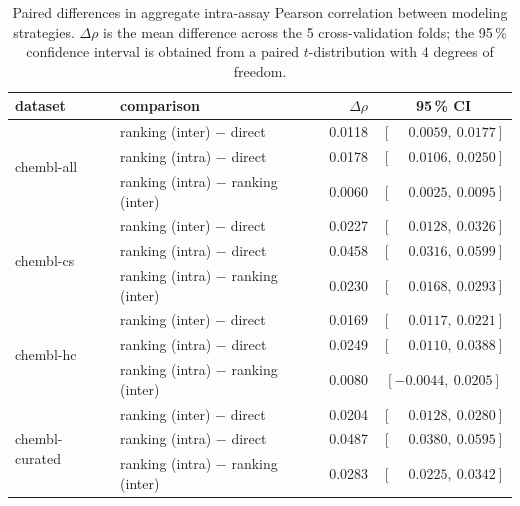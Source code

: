\begin{table}[tb]
\centering
\caption{\label{tab:pairwise-differences-chembl}Paired differences in aggregate intra-assay Pearson
correlation between modeling strategies. $\Delta\rho$ is the mean difference across the 5
cross-validation folds; the 95\,\% confidence interval is obtained from a paired $t$-distribution
with $4$ degrees of freedom.}
\begin{tabular}{llrc}
\toprule
{dataset} & {comparison} & {$\Delta\rho$} & {95\,\% CI} \\
\midrule
\multirow[t]{3}{*}{chembl-all}
 & ranking (inter) $-$ direct & 0.0118 & $[\phantom{-}0.0059,\ 0.0177]$ \\
 & ranking (intra) $-$ direct & 0.0178 & $[\phantom{-}0.0106,\ 0.0250]$ \\
 & ranking (intra) $-$ ranking (inter) & 0.0060 & $[\phantom{-}0.0025,\ 0.0095]$ \\
\midrule
\multirow[t]{3}{*}{chembl-cs}
 & ranking (inter) $-$ direct & 0.0227 & $[\phantom{-}0.0128,\ 0.0326]$ \\
 & ranking (intra) $-$ direct & 0.0458 & $[\phantom{-}0.0316,\ 0.0599]$ \\
 & ranking (intra) $-$ ranking (inter) & 0.0230 & $[\phantom{-}0.0168,\ 0.0293]$ \\
\midrule
\multirow[t]{3}{*}{chembl-hc}
 & ranking (inter) $-$ direct & 0.0169 & $[\phantom{-}0.0117,\ 0.0221]$ \\
 & ranking (intra) $-$ direct & 0.0249 & $[\phantom{-}0.0110,\ 0.0388]$ \\
 & ranking (intra) $-$ ranking (inter) & 0.0080 & $[-0.0044,\ 0.0205]$ \\
\midrule
\multirow[t]{3}{*}{chembl-curated}
 & ranking (inter) $-$ direct & 0.0204 & $[\phantom{-}0.0128,\ 0.0280]$ \\
 & ranking (intra) $-$ direct & 0.0487 & $[\phantom{-}0.0380,\ 0.0595]$ \\
 & ranking (intra) $-$ ranking (inter) & 0.0283 & $[\phantom{-}0.0225,\ 0.0342]$ \\
\bottomrule
\end{tabular}
\end{table}
